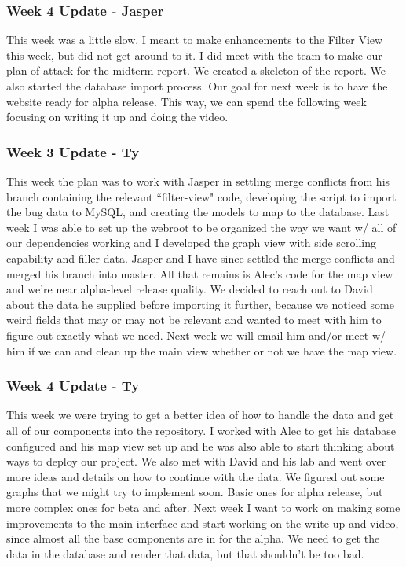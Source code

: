 \subsubsection{Week 4 Update - Jasper}
This week was a little slow.
I meant to make enhancements to the Filter View this week, but did not get around to it.
I did meet with the team to make our plan of attack for the midterm report.
We created a skeleton of the report.
We also started the database import process.
Our goal for next week is to have the website ready for alpha release.
This way, we can spend the following week focusing on writing it up and doing the video.​

\subsubsection{Week 3 Update - Ty}
This week the plan was to work with Jasper in settling merge conflicts from his branch containing the relevant ``filter-view" code, developing the script to import the bug data to MySQL​, and creating the models to map to the database.
Last week I was able to set up the webroot to be organized the way we want w/ all of our dependencies working and I developed the graph view with side scrolling capability and filler data.
Jasper and I have since settled the merge conflicts and merged his branch into master.
All that remains is Alec's code for the map view and we're near alpha-level release quality.
We decided to reach out to David about the data he supplied before importing it further, because we noticed some weird fields that may or may not be relevant and wanted to meet with him to figure out exactly what we need.
Next week we will email him and/or meet w/ him if we can and clean up the main view whether or not we have the map view.

\subsubsection{Week 4 Update - Ty}
This week we were trying to get a better idea of how to handle the data and get all of our components into the repository.
I worked with Alec to get his database configured and his map view set up and he was also able to start thinking about ways to deploy our project.
We also met with David and his lab and went over more ideas and details on how to continue with the data.
We figured out some graphs that we might try to implement soon.
Basic ones for alpha release, but more complex ones for beta and after.
​Next week I want to work on making some improvements to the main interface and start working on the write up and video, since almost all the base components are in for the alpha.
We need to get the data in the database and render that data, but that shouldn't be too bad.

